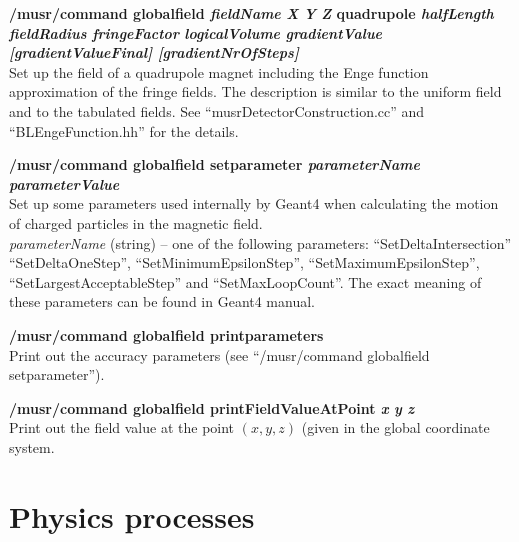\documentclass[twoside]{dis04}
\begin{document}
\begin{description}
\item{\bf /musr/command globalfield \emph{fieldName} \emph{X} \emph{Y} \emph{Z} quadrupole
	\emph{halfLength} \emph{fieldRadius} \emph{fringeFactor} \emph{logicalVolume} 
	\emph{gradientValue} \emph{[gradientValueFinal]} \emph{[gradientNrOfSteps]} }\\
	Set up the field of a quadrupole magnet including the Enge function approximation of the
	fringe fields.  The description is similar to the uniform field and to the tabulated fields.
	See ``musrDetectorConstruction.cc'' and ``BLEngeFunction.hh'' for the details.

\item{\bf /musr/command globalfield setparameter \emph{parameterName} \emph{parameterValue} }\\
	Set up some parameters used internally by Geant4 when calculating the motion
	of charged particles in the magnetic field.\\
	\emph{parameterName} (string) -- one of the following parameters: ``SetDeltaIntersection''
	``SetDeltaOneStep'', ``SetMinimumEpsilonStep'', ``SetMaximumEpsilonStep'',
	``SetLargestAcceptableStep'' and ``SetMaxLoopCount''.  The exact meaning of
	these parameters can be found in Geant4 manual.

\item{\bf /musr/command globalfield printparameters} \\
	Print out the accuracy parameters (see ``/musr/command globalfield setparameter'').

\item{\bf /musr/command globalfield printFieldValueAtPoint \emph{x} \emph{y} \emph{z}} \\
	Print out the field value at the point $(x, y, z)$ (given in the global 
	coordinate system.
\end{description}

\section{Physics processes}
\end{document}
